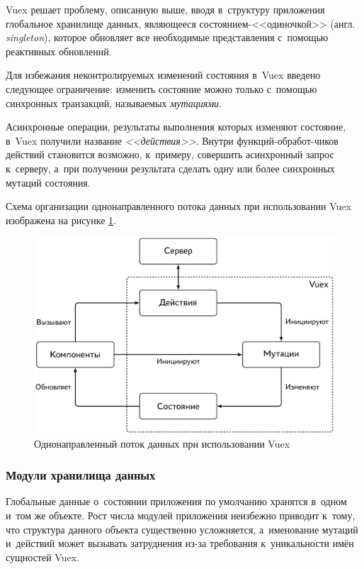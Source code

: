 Vuex решает проблему, описанную выше, вводя в~структуру приложения глобальное хранилище данных, являющееся состоянием-<<одиночкой>> (англ. \emph{singleton}), которое обновляет все необходимые представления с~помощью реактивных обновлений.

Для избежания неконтролируемых изменений состояния в~Vuex введено следующее ограничение: изменить состояние можно только с~помощью синхронных транзакций, называемых \emph{мутациями}.

Асинхронные операции, результаты выполнения которых изменяют состояние, в~Vuex получили название \emph{<<действия>>}. Внутри функций-обработ-чиков действий становится возможно, к~примеру, совершить асинхронный запрос к~серверу, а~при получении результата сделать одну или более синхронных мутаций состояния.

Схема организации однонаправленного потока данных при использовании Vuex изображена на рисунке \ref{fig:vuex-oneway-data-flow}.

\begin{figure}[h!]
  \centering
  \setlength{\fboxsep}{5pt}
  \includegraphics[width=.9\textwidth]{img/tikz/vuex-oneway-data-flow/pic}
  \vspace*{12pt}
  \caption{Однонаправленный поток данных при использовании Vuex}\label{fig:vuex-oneway-data-flow}
\end{figure}


\subsubsection{Модули хранилища данных}

Глобальные данные о~состоянии приложения по умолчанию хранятся в~одном и~том же объекте. Рост числа модулей приложения неизбежно приводит к~тому, что структура данного объекта существенно усложняется, а~именование мутаций и~действий может вызывать затруднения из-за требования к~уникальности имён сущностей Vuex.

